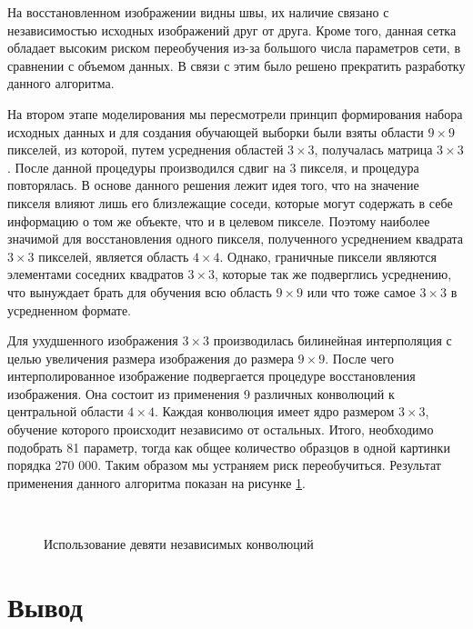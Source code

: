 \documentclass[12pt,twoside]{article}
\begin{document}
	На восстановленном изображении видны швы, их наличие связано с независимостью исходных изображений друг от друга. Кроме того, данная сетка обладает высоким риском переобучения из-за большого числа параметров сети, в сравнении с объемом данных. В связи с этим было решено прекратить разработку данного алгоритма.
	
	На втором этапе моделирования мы пересмотрели принцип формирования набора исходных данных и для создания обучающей выборки были взяты области $9 \times 9$ пикселей, из которой, путем усреднения областей $3 \times 3$, получалась матрица $3 \times 3$.  После данной процедуры производился сдвиг на 3 пикселя, и процедура повторялась. В основе данного решения лежит идея того, что на значение пикселя влияют лишь его близлежащие соседи, которые могут содержать в себе информацию о том же объекте, что и в целевом пикселе. Поэтому наиболее значимой для восстановления одного пикселя, полученного усреднением квадрата $3 \times 3$ пикселей, является область $4 \times 4$. Однако, граничные пиксели являются элементами соседних квадратов $3 \times 3$, которые так же подверглись усреднению, что вынуждает брать для обучения всю область $9 \times 9$ или что тоже самое $3 \times 3$ в усредненном формате.
	
	Для ухудшенного изображения $3 \times 3$ производилась билинейная интерполяция с целью увеличения размера изображения до размера $9 \times 9$. После чего интерполированное изображение подвергается процедуре восстановления изображения. Она состоит из применения 9 различных конволюций к центральной области $4 \times 4$. Каждая конволюция имеет ядро размером $3 \times 3$, обучение которого происходит независимо от остальных. Итого, необходимо подобрать 81 параметр, тогда как общее количество образцов в одной картинки порядка 270 000. Таким образом мы устраняем риск переобучиться. Результат применения данного алгоритма показан на рисунке \ref{fig:9conv}.

\begin{figure}[h]
	\centering
	\\
	\caption{Использование девяти независимых конволюций}
	\label{fig:9conv}
\end{figure}


	
\section{Вывод}
\end{document}
